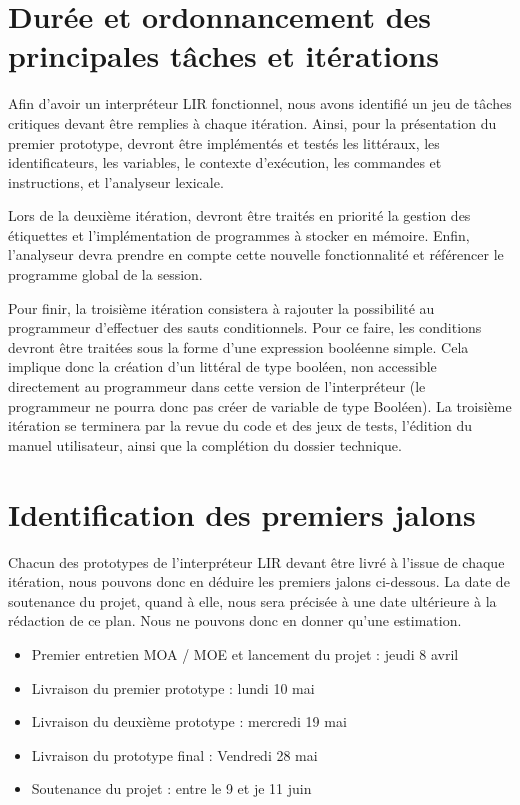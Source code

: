 \documentclass[12pt,a4paper,titlepage,openany, oneside]{report}
\begin{document}
    \section{Durée et ordonnancement des principales tâches et itérations}
        Afin d'avoir un interpréteur LIR fonctionnel, nous avons identifié un jeu de
        tâches critiques devant être remplies à chaque itération. Ainsi, pour la
        présentation du premier prototype, devront être implémentés et testés les
        littéraux, les identificateurs, les variables, le contexte d'exécution, les
        commandes et instructions, et l'analyseur lexicale.

        Lors de la deuxième itération, devront être traités en priorité la gestion des
        étiquettes et l'implémentation de programmes à stocker en mémoire. Enfin,
        l'analyseur devra prendre en compte cette nouvelle fonctionnalité et référencer
        le programme global de la session.

        Pour finir, la troisième itération consistera à rajouter la possibilité au
        programmeur d'effectuer des sauts conditionnels. Pour ce faire, les conditions
        devront être traitées sous la forme d'une expression booléenne simple. Cela
        implique donc la création d'un littéral de type booléen, non accessible directement
        au programmeur dans cette version de l'interpréteur (le programmeur ne pourra donc
        pas créer de variable de type Booléen). La troisième itération se terminera par
        la revue du code et des jeux de tests, l'édition du manuel utilisateur, ainsi que
        la complétion du dossier technique.

    \section{Identification des premiers jalons}
        Chacun des prototypes de l'interpréteur LIR devant être livré à l'issue de chaque
        itération, nous pouvons donc en déduire les premiers jalons ci-dessous. La date de
        soutenance du projet, quand à elle, nous sera précisée à une date ultérieure à
        la rédaction de ce plan. Nous ne pouvons donc en donner qu'une estimation.

        \begin{itemize}
            \item Premier entretien MOA / MOE et lancement du projet :
                  jeudi 8 avril
            \item Livraison du premier prototype : lundi 10 mai
            \item Livraison du deuxième prototype : mercredi 19 mai
            \item Livraison du prototype final : Vendredi 28 mai
            \item Soutenance du projet : entre le 9 et je 11 juin
        \end{itemize}
\end{document}

